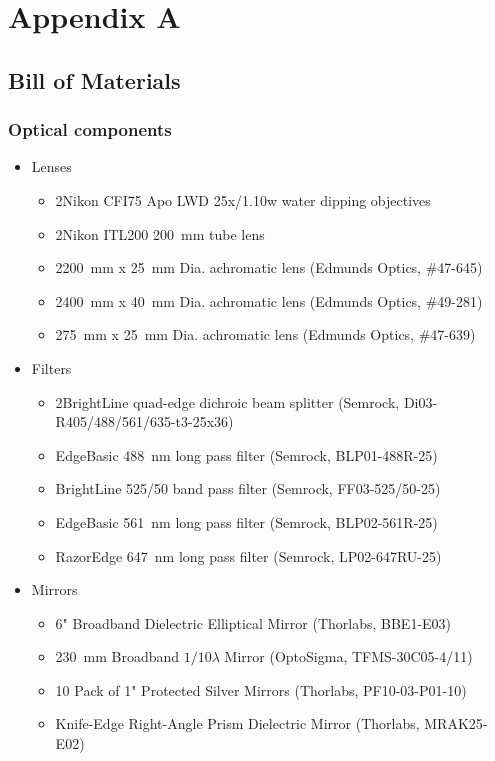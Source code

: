\cleardoublepage
\chapter*{Appendix A}

\begin{singlespace}
  
\section*{Bill of Materials}

\subsection*{Optical components}
  \begin{itemize}
    \item Lenses
    \begin{itemize}
      \item 2\texttimes Nikon CFI75 Apo LWD 25x/1.10w water dipping objectives
      \item 2\texttimes Nikon ITL200 \SI{200}{mm} tube lens
      \item 2\texttimes \SI{200}{mm} x \SI{25}{mm} Dia. achromatic lens (Edmunds Optics, \#47-645)
      \item 2\texttimes \SI{400}{mm} x \SI{40}{mm} Dia. achromatic lens (Edmunds Optics, \#49-281)
      \item 2\texttimes \SI{75}{mm} x \SI{25}{mm} Dia. achromatic lens (Edmunds Optics, \#47-639)
    \end{itemize}
    \item Filters
    \begin{itemize}
      \item 2\texttimes BrightLine quad-edge dichroic beam splitter (Semrock, Di03-R405/488/561/635-t3-25x36)
      \item EdgeBasic \SI{488}{nm} long pass filter (Semrock, BLP01-488R-25)
      \item BrightLine 525/50 band pass filter (Semrock, FF03-525/50-25)
      \item EdgeBasic \SI{561}{nm} long pass filter (Semrock, BLP02-561R-25)
      \item RazorEdge \SI{647}{nm} long pass filter (Semrock, LP02-647RU-25)
    \end{itemize}
    \item Mirrors
    \begin{itemize}
      \item 6" Broadband Dielectric Elliptical Mirror (Thorlabs, BBE1-E03)
      \item 2\texttimes \SI{30}{mm} Broadband $1/10 \lambda$ Mirror (OptoSigma, TFMS-30C05-4/11)
      \item 10 Pack of 1" Protected Silver Mirrors (Thorlabs, PF10-03-P01-10)
      \item Knife-Edge Right-Angle Prism Dielectric Mirror (Thorlabs, MRAK25-E02)
    \end{itemize}
  \end{itemize}


\end{singlespace}
